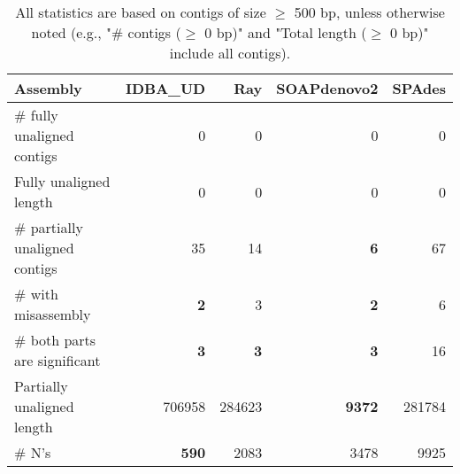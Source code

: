 \documentclass[12pt,a4paper]{article}
\begin{document}
\begin{table}[ht]
\begin{center}
\caption{All statistics are based on contigs of size $\geq$ 500 bp, unless otherwise noted (e.g., "\# contigs ($\geq$ 0 bp)" and "Total length ($\geq$ 0 bp)" include all contigs).}
\begin{tabular}{|l*{4}{|r}|}
\hline
Assembly & IDBA\_UD & Ray & SOAPdenovo2 & SPAdes \\ \hline
\# fully unaligned contigs & 0 & 0 & 0 & 0 \\ \hline
Fully unaligned length & 0 & 0 & 0 & 0 \\ \hline
\# partially unaligned contigs & 35 & 14 & {\bf 6} & 67 \\ \hline
\hspace{5mm}\# with misassembly & {\bf 2} & 3 & {\bf 2} & 6 \\ \hline
\hspace{5mm}\# both parts are significant & {\bf 3} & {\bf 3} & {\bf 3} & 16 \\ \hline
Partially unaligned length & 706958 & 284623 & {\bf 9372} & 281784 \\ \hline
\# N's & {\bf 590} & 2083 & 3478 & 9925 \\ \hline
\end{tabular}
\end{center}
\end{table}
\end{document}
